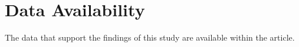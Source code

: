 \documentclass{article}
\begin{document}


\section*{Data Availability}
The data that support the findings of this study are available within the article.


 


\end{document}
